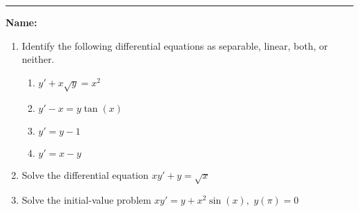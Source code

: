 \documentclass[11pt]{article}
\begin{document}
    \hrule
    \vspace{.5cm}
    \noindent\textbf{Name:} \underline{\qquad\qquad\qquad\qquad\qquad\qquad\qquad\qquad\qquad\qquad\qquad\qquad\qquad}

    \begin{enumerate}
        \item Identify the following differential equations as separable, linear, both, or neither.
        \begin{enumerate}
            \item $y'+x\sqrt{y}=x^{2}$\vfill
            \item $y'-x=y\tan(x)$\vfill
            \item $y'=y-1$\vfill
            \item $y'=x-y$\vfill
        \end{enumerate}
        \newpage
        \item Solve the differential equation $xy'+y=\sqrt{x}$\vfill
        \item Solve the initial-value problem $xy'=y+x^2\sin(x),$ $y(\pi)=0$\vfill
    \end{enumerate}
\end{document}
